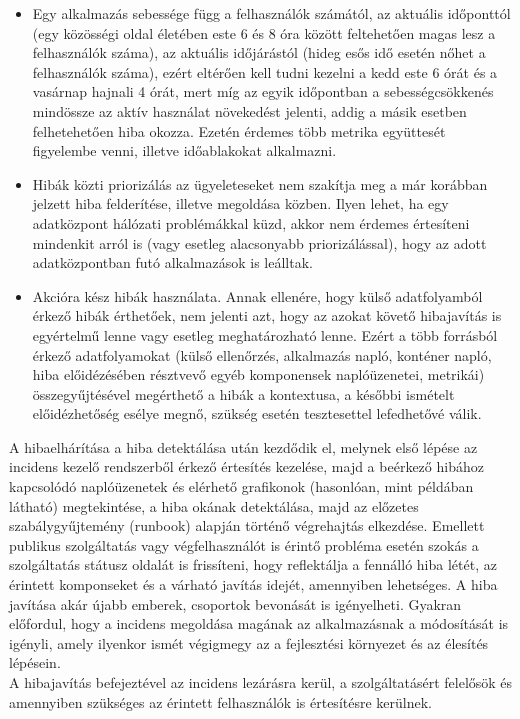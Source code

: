\begin{itemize}
  \item Egy alkalmazás sebessége függ a felhasználók számától, az aktuális időponttól (egy közösségi oldal életében este 6 és 8 óra között feltehetően magas lesz a felhasználók száma), az aktuális időjárástól (hideg esős idő esetén nőhet a felhasználók száma), ezért eltérően kell tudni kezelni a kedd este 6 órát és a vasárnap hajnali 4 órát, mert míg az egyik időpontban a sebességcsökkenés mindössze az aktív használat növekedést jelenti, addig a másik esetben felhetehetően hiba okozza. Ezetén érdemes több metrika együttesét figyelembe venni, illetve időablakokat alkalmazni.
  \item Hibák közti priorizálás az ügyeleteseket nem szakítja meg a már korábban jelzett hiba felderítése, illetve megoldása közben. Ilyen lehet, ha egy adatközpont hálózati problémákkal küzd, akkor nem érdemes értesíteni mindenkit arról is (vagy esetleg alacsonyabb priorizálással), hogy az adott adatközpontban futó alkalmazások is leálltak.
  \item Akcióra kész hibák használata. Annak ellenére, hogy külső adatfolyamból érkező hibák érthetőek, nem jelenti azt, hogy az azokat követő hibajavítás is egyértelmű lenne vagy esetleg meghatározható lenne. Ezért a több forrásból érkező adatfolyamokat (külső ellenőrzés, alkalmazás napló, konténer napló, hiba előidézésében résztvevő egyéb komponensek naplóüzenetei, metrikái) összegyűjtésével megérthető a hibák a kontextusa, a későbbi ismételt előidézhetőség esélye megnő, szükség esetén tesztesettel lefedhetővé válik.
\end{itemize}

A hibaelhárítása a hiba detektálása után kezdődik el, melynek első lépése az incidens kezelő rendszerből érkező értesítés kezelése, majd a beérkező hibához kapcsolódó naplóüzenetek és elérhető grafikonok (hasonlóan, mint  példában látható) megtekintése, a hiba okának detektálása, majd az előzetes szabálygyűjtemény (runbook) alapján történő végrehajtás elkezdése.
Emellett publikus szolgáltatás vagy végfelhasználót is érintő probléma esetén szokás a szolgáltatás státusz oldalát is frissíteni, hogy reflektálja a fennálló hiba létét, az érintett komponseket és a várható javítás idejét, amennyiben lehetséges. A hiba javítása akár újabb emberek, csoportok bevonását is igényelheti. Gyakran előfordul, hogy a incidens megoldása magának az alkalmazásnak a módosítását is igényli, amely ilyenkor ismét végigmegy az a fejlesztési környezet és az élesítés lépésein.\hfill\\
A hibajavítás befejeztével az incidens lezárásra kerül, a szolgáltatásért felelősök és  amennyiben szükséges az érintett felhasználók is értesítésre kerülnek.

